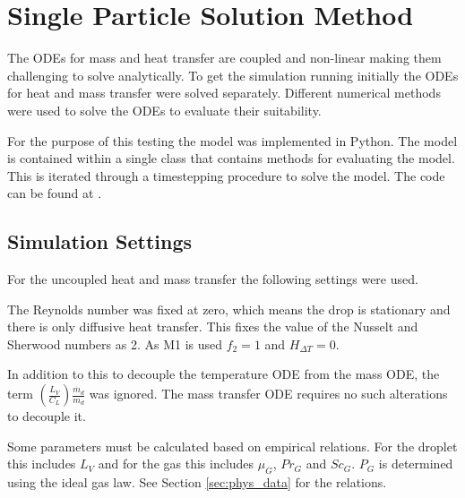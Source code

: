 \documentclass[../Interim_Report_Master]{subfiles}
\begin{document}
\hypertarget{sol_meth}{\section{Single Particle Solution Method}\label{sol_meth}}
The ODEs for mass and heat transfer are coupled and non-linear making them challenging to solve analytically. To get the simulation running initially the ODEs for heat and mass transfer were solved separately. Different numerical methods were used to solve the ODEs to evaluate their suitability. 

For the purpose of this testing the model was implemented in Python. The model is contained within a single class that contains methods for evaluating the model. This is iterated through a timestepping procedure to solve the model. The code can be found at \cite{andrew_py}.

\subsection{Simulation Settings}\label{sec:sim_set}
For the uncoupled heat and mass transfer the following settings were used. 

The Reynolds number was fixed at zero, which means the drop is stationary and there is only diffusive heat transfer. This fixes the value of the Nusselt and Sherwood numbers as 2. As M1 is used $f_2=1$ and $H_{\Delta T}=0$. 

In addition to this to decouple the temperature ODE from the mass ODE, the term $\left(\frac{L_V}{C_L}\right)\frac{\dot{m_d}}{m_d}$ was ignored. The mass transfer ODE requires no such alterations to decouple it. 

Some parameters must be calculated based on empirical relations. For the droplet this includes $L_V$ and for the gas this includes $\mu_G$, $Pr_G$ and $Sc_G$. $P_G$ is determined using the ideal gas law. See Section \ref{sec:phys_data} for the relations. 
\end{document}
